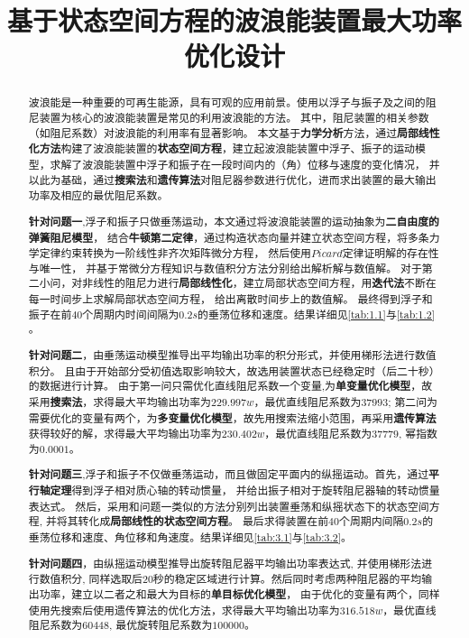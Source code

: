 \documentclass[withoutpreface,bwprint]{cumcmthesis} %
\title{基于状态空间方程的波浪能装置最大功率优化设计}
\begin{document}
    \maketitle
    \begin{abstract}
        波浪能是一种重要的可再生能源，具有可观的应用前景。使用以浮子与振子及之间的阻尼装置为核心的波浪能装置是常见的利用波浪能的方法。
        其中，阻尼装置的相关参数（如阻尼系数）对波浪能的利用率有显著影响。
        本文基于\textbf{力学分析}方法，通过\textbf{局部线性化方法}构建了波浪能装置的\textbf{状态空间方程}，建立起波浪能装置中浮子、振子的运动模型，求解了波浪能装置中浮子和振子在一段时间内的（角）位移与速度的变化情况，
        并以此为基础，通过\textbf{搜索法}和\textbf{遗传算法}对阻尼器参数进行优化，进而求出装置的最大输出功率及相应的最优阻尼系数。
        
        \textbf{针对问题一},浮子和振子只做垂荡运动，本文通过将波浪能装置的运动抽象为\textbf{二自由度的弹簧阻尼模型}，
        结合\textbf{牛顿第二定律}，通过构造状态向量并建立状态空间方程，将多条力学定律约束转换为一阶线性非齐次矩阵微分方程，
        然后使用$Picard$定律证明解的存在性与唯一性，
        并基于常微分方程知识与数值积分方法分别给出解析解与数值解。
        对于第二小问，对非线性的阻尼力进行\textbf{局部线性化}，建立局部状态空间方程，用\textbf{迭代法}不断在每一时间步上求解局部状态空间方程，
        给出离散时间步上的数值解。
        最终得到浮子和振子在前$40$个周期内时间间隔为$0.2s$的垂荡位移和速度。结果详细见\cref{tab:1.1}与\cref{tab:1.2} 。
    
        \textbf{针对问题二}，由垂荡运动模型推导出平均输出功率的积分形式，并使用梯形法进行数值积分。
        且由于开始部分受初值选取影响较大，故选用装置状态已经稳定时（后二十秒）的数据进行计算。
        由于第一问只需优化直线阻尼系数一个变量,为\textbf{单变量优化模型}，故采用\textbf{搜索法}，求得最大平均输出功率为$229.997w$，最优直线阻尼系数为$37993$;
        第二问为需要优化的变量有两个，为\textbf{多变量优化模型}，故先用搜索法缩小范围，再采用\textbf{遗传算法}获得较好的解，求得最大平均输出功率为$230.402w$，最优直线阻尼系数为$37779$, 幂指数为$0.0001$。
    
        \textbf{针对问题三},浮子和振子不仅做垂荡运动，而且做固定平面内的纵摇运动。首先，通过\textbf{平行轴定理}得到浮子相对质心轴的转动惯量，
        并给出振子相对于旋转阻尼器轴的转动惯量表达式。
        然后，采用和问题一类似的方法分别列出装置垂荡和纵摇状态下的状态空间方程, 并将其转化成\textbf{局部线性的状态空间方程}。
        最后求得装置在前$40$个周期内间隔$0.2s$的垂荡位移和速度、角位移和角速度。结果详细见\cref{tab:3.1}与\cref{tab:3.2}。
    
        \textbf{针对问题四}，由纵摇运动模型推导出旋转阻尼器平均输出功率表达式, 并使用梯形法进行数值积分,
        同样选取后20秒的稳定区域进行计算。然后同时考虑两种阻尼器的平均输出功率，建立以二者之和最大为目标的\textbf{单目标优化模型}，
        由于优化的变量有两个，同样使用先搜索后使用遗传算法的优化方法，求得最大平均输出功率为$316.518w$，最优直线阻尼系数为$60448$, 最优旋转阻尼系数为$100000$。
    \end{abstract}
\end{document}
